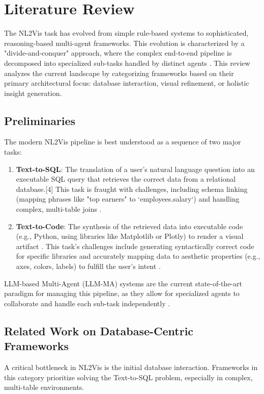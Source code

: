 \documentclass[a4paper,oneside,bibliography=totoc]{scrbook}
\begin{document}
\chapter{Literature Review}
\label{ch:related_work}

The NL2Vis task has evolved from simple rule-based systems to sophisticated, reasoning-based multi-agent frameworks. This evolution is characterized by a "divide-and-conquer" approach, where the complex end-to-end pipeline is decomposed into specialized sub-tasks handled by distinct agents \cite{[5]}. This review analyzes the current landscape by categorizing frameworks based on their primary architectural focus: database interaction, visual refinement, or holistic insight generation.

\section{Preliminaries}
\label{sec:preliminaries}

The modern NL2Vis pipeline is best understood as a sequence of two major tasks:
\begin{enumerate}
 \item \textbf{Text-to-SQL}: The translation of a user's natural language question into an executable SQL query that retrieves the correct data from a relational database.[4] This task is fraught with challenges, including schema linking (mapping phrases like "top earners" to `employees.salary`) and handling complex, multi-table joins \cite{[25, 26]}.
 \item \textbf{Text-to-Code}: The synthesis of the retrieved data into executable code (e.g., Python, using libraries like Matplotlib or Plotly) to render a visual artifact \cite{[19]}. This task's challenges include generating syntactically correct code for specific libraries and accurately mapping data to aesthetic properties (e.g., axes, colors, labels) to fulfill the user's intent \cite{[27]}.
\end{enumerate}
LLM-based Multi-Agent (LLM-MA) systems are the current state-of-the-art paradigm for managing this pipeline, as they allow for specialized agents to collaborate and handle each sub-task independently \cite{[5]}.

\section{Related Work on Database-Centric Frameworks}
\label{sec:related_work_A}

A critical bottleneck in NL2Vis is the initial database interaction. Frameworks in this category prioritize solving the Text-to-SQL problem, especially in complex, multi-table environments.
\end{document}

